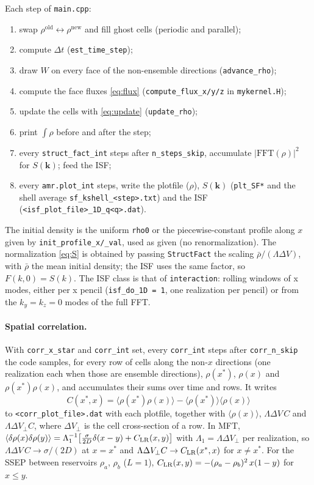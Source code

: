 \documentclass[11pt]{article}
\newcommand{\code}[1]{\texttt{#1}}
\begin{document}
Each step of \code{main.cpp}:
\begin{enumerate}[nosep]
  \item swap $\rho^{\mathrm{old}}\leftrightarrow\rho^{\mathrm{new}}$ and fill
        ghost cells (periodic and parallel);
  \item compute $\Delta t$ (\code{est\_time\_step});
  \item draw $W$ on every face of the non-ensemble directions
        (\code{advance\_rho});
  \item compute the face fluxes \eqref{eq:flux} (\code{compute\_flux\_x/y/z}
        in \code{mykernel.H});
  \item update the cells with \eqref{eq:update} (\code{update\_rho});
  \item print $\int\rho$ before and after the step;
  \item every \code{struct\_fact\_int} steps after \code{n\_steps\_skip},
        accumulate $|\mathrm{FFT}(\rho)|^2$ for $S(\mathbf k)$; feed the ISF;
  \item every \code{amr.plot\_int} steps, write the plotfile ($\rho$),
        $S(\mathbf k)$ (\code{plt\_SF*} and the shell average
        \code{sf\_kshell\_<step>.txt}) and the ISF (\code{<isf\_plot\_file>\_1D\_q<q>.dat}).
\end{enumerate}
The initial density is the uniform \code{rho0} or the piecewise-constant
profile along $x$ given by \code{init\_profile\_x/\_val}, used as given (no
renormalization). The normalization \eqref{eq:S} is obtained by passing
\code{StructFact} the scaling $\bar\rho/(\Lambda\Delta V)$, with
$\bar\rho$ the mean initial density; the ISF uses the same factor, so
$F(k,0)=S(k)$. The ISF class is that of \code{interaction}: rolling windows
of x modes, either per x pencil (\code{isf\_do\_1D = 1}, one realization per
pencil) or from the $k_y=k_z=0$ modes of the full FFT.

\paragraph{Spatial correlation.} With \code{corr\_x\_star} and
\code{corr\_int} set, every \code{corr\_int} steps after \code{corr\_n\_skip}
the code samples, for every row of cells along the non-$x$ directions (one
realization each when those are ensemble directions), $\rho(x^*)$,
$\rho(x)$ and $\rho(x^*)\rho(x)$, and accumulates their sums over time and
rows. It writes
\begin{equation}
  C(x^*,x) = \langle\rho(x^*)\rho(x)\rangle - \langle\rho(x^*)\rangle\langle\rho(x)\rangle
\end{equation}
to \code{<corr\_plot\_file>.dat} with each plotfile, together with
$\langle\rho(x)\rangle$, $\Lambda\Delta V\,C$ and $\Lambda\Delta V_\perp C$, where
$\Delta V_\perp$ is the cell cross-section of a row. In MFT,
$\langle\delta\rho(x)\delta\rho(y)\rangle = \Lambda_1^{-1}\big[\tfrac{\sigma}{2D}\delta(x-y)
+ C_{\rm LR}(x,y)\big]$ with $\Lambda_1=\Lambda\Delta V_\perp$ per realization,
so $\Lambda\Delta V\,C\to\sigma/(2D)$ at $x=x^*$ and $\Lambda\Delta V_\perp C\to
C_{\rm LR}(x^*,x)$ for $x\neq x^*$. For the SSEP between reservoirs $\rho_a$,
$\rho_b$ ($L=1$), $C_{\rm LR}(x,y) = -(\rho_a-\rho_b)^2\,x(1-y)$ for $x\le y$.
\end{document}
